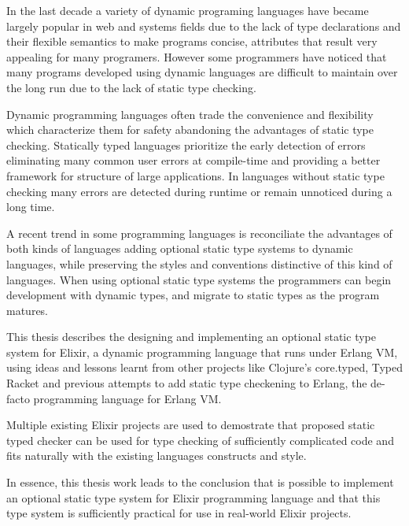 %
%
%

In the last decade a variety of dynamic programing languages have became
largely popular in web and systems fields due to the lack of type declarations
and their flexible semantics to make programs concise, attributes that result
very appealing for many programers. However some programmers have noticed that
many programs developed using dynamic languages are difficult to maintain over
the long run due to the lack of static type checking.

Dynamic programming languages often trade the convenience and flexibility which
characterize them for safety abandoning the advantages of static type checking.
Statically typed languages prioritize the early detection of errors eliminating
many common user errors at compile-time and providing a better framework for
structure of large applications. In languages without static type checking many
errors are detected during runtime or remain unnoticed during a long time.

A recent trend in some programming languages is reconciliate the advantages of
both kinds of languages adding optional static type systems to dynamic
languages, while preserving the styles and conventions distinctive of this kind
of languages. When using optional static type systems the programmers can begin
development with dynamic types, and migrate to static types as the program
matures.

This thesis describes the designing and implementing an optional static
type system for Elixir, a dynamic programming language that runs under
Erlang VM, using ideas and lessons learnt from other projects like Clojure's
core.typed, Typed Racket and previous attempts to add static type checkening
to Erlang, the de-facto programming language for Erlang VM.

Multiple existing Elixir projects are used to demostrate that proposed
static typed checker can be used for type checking of sufficiently complicated
code and fits naturally with the existing languages constructs and style.

In essence, this thesis work leads to the conclusion that is possible to implement
an optional static type system for Elixir programming language and that this type
system is sufficiently practical for use in real-world Elixir projects.

